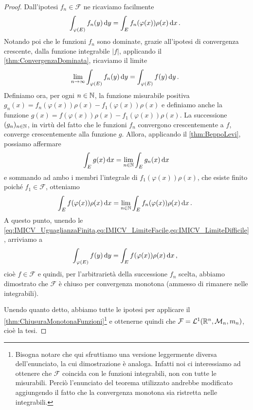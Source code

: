 \begin{proof}
	Dall'ipotesi $f_n\in\mathcal F$ ne ricaviamo facilmente
	\begin{equation}\label{eq:IMICV_UguaglianzaFinita}
		\int_{\varphi(E)} f_n(y)\,\mathrm d y = \int_E f_n(\varphi(x))\rho(x)\,\mathrm d x\, \text{. }
	\end{equation}
	Notando poi che le funzioni $f_n$ sono dominate, grazie all'ipotesi di convergenza crescente, dalla funzione integrabile $|f|$, applicando il \cref{thm:ConvergenzaDominata}, ricaviamo il limite
	\begin{equation}\label{eq:IMICV_LimiteFacile}
		\lim_{n\to\infty} \int_{\varphi(E)} f_n(y)\,\mathrm d y = \int_{\varphi(E)} f(y) \,\mathrm d y\, \text{. }
	\end{equation}
	Definiamo ora, per ogni $n\in\mathbb N$, la funzione misurabile positiva $g_n(x)=f_n(\varphi(x))\rho(x)-f_1(\varphi(x))\rho(x)$ e definiamo anche la funzione $g(x)=f(\varphi(x))\rho(x)-f_1(\varphi(x))\rho(x)$.
	La successione $(g_n)_{n\in\mathbb N}$, in virtù del fatto che le funzioni $f_n$ convergono crescentemente a $f$, converge crescentemente alla funzione $g$.
	Allora, applicando il \cref{thm:BeppoLevi}, possiamo affermare
	\begin{equation*}
		\int_E g(x)\,\mathrm d x=\lim_{n\in\mathbb N} \int_E g_n(x)\,\mathrm d x
	\end{equation*}
	e sommando ad ambo i membri l'integrale di $f_1(\varphi(x))\rho(x)$, che esiste finito poiché $f_1\in\mathcal F$, otteniamo
	\begin{equation}\label{eq:IMICV_LimiteDifficile}
		\int_E f(\varphi(x))\rho(x)\,\mathrm d x=\lim_{n\in\mathbb N} \int_E f_n(\varphi(x))\rho(x)\,\mathrm d x \, \text{. }
	\end{equation}
	A questo punto, unendo le \cref{eq:IMICV_UguaglianzaFinita,eq:IMICV_LimiteFacile,eq:IMICV_LimiteDifficile}, arriviamo a
	\begin{equation*}
		\int_{\varphi(E)} f(y)\,\mathrm d y=\int_E f(\varphi(x))\rho(x)\,\mathrm d x\, \text{, }
	\end{equation*}
	cioè $f\in\mathcal F$ e quindi, per l'arbitrarietà della successione $f_n$ scelta, abbiamo dimostrato che $\mathcal F$ è chiuso per convergenza monotona (ammesso di rimanere nelle integrabili).
	
	Unendo quanto detto, abbiamo tutte le ipotesi per applicare il \cref{thm:ChiusuraMonotonaFunzioni}\footnote{Bisogna notare che qui sfruttiamo una versione leggermente diversa dell'enunciato, la cui dimostrazione è analoga. Infatti noi ci interessiamo ad ottenere che $\mathcal F$ coincida con le funzioni integrabili, non con tutte le misurabili. 
	Perciò l'enunciato del teorema utilizzato andrebbe modificato aggiungendo il fatto che la convergenza monotona sia ristretta nelle integrabili.} e ottenerne quindi che $\mathcal F=\mathcal L^1(\mathbb R^n,\mathcal M_n,m_n)$, cioè la tesi.
\end{proof}




